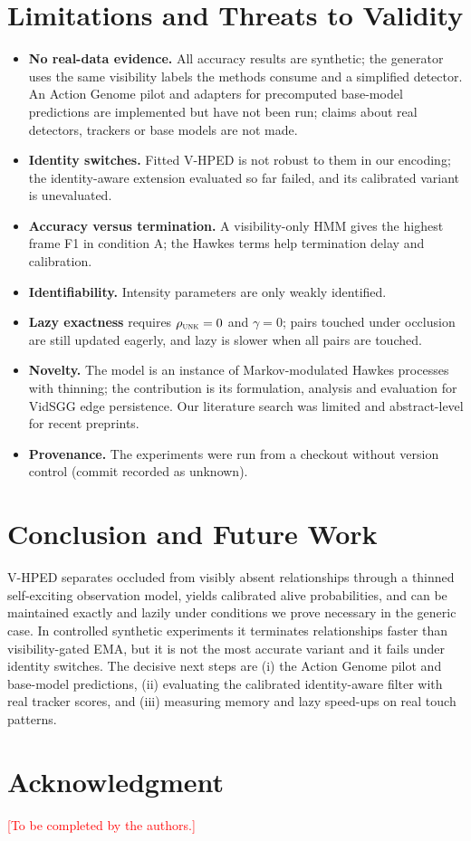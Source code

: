 \documentclass[conference]{IEEEtran}
\newcommand{\UNK}{\textsc{unk}}
\begin{document}
\section{Limitations and Threats to Validity}
\begin{itemize}
\item \textbf{No real-data evidence.} All accuracy results are synthetic; the generator
uses the same visibility labels the methods consume and a simplified detector. An Action
Genome pilot and adapters for precomputed base-model predictions are implemented but have
not been run; claims about real detectors, trackers or base models are not made.
\item \textbf{Identity switches.} Fitted V-HPED is not robust to them in our encoding; the
identity-aware extension evaluated so far failed, and its calibrated variant is unevaluated.
\item \textbf{Accuracy versus termination.} A visibility-only HMM gives the highest frame F1
in condition A; the Hawkes terms help termination delay and calibration.
\item \textbf{Identifiability.} Intensity parameters are only weakly identified.
\item \textbf{Lazy exactness} requires $\rho_{\UNK}=0$ and $\gamma=0$; pairs touched under
occlusion are still updated eagerly, and lazy is slower when all pairs are touched.
\item \textbf{Novelty.} The model is an instance of Markov-modulated Hawkes processes with
thinning; the contribution is its formulation, analysis and evaluation for VidSGG edge
persistence. Our literature search was limited and abstract-level for recent preprints.
\item \textbf{Provenance.} The experiments were run from a checkout without version control
(commit recorded as unknown).
\end{itemize}

\section{Conclusion and Future Work}
V-HPED separates occluded from visibly absent relationships through a thinned
self-exciting observation model, yields calibrated alive probabilities, and can be
maintained exactly and lazily under conditions we prove necessary in the generic case. In
controlled synthetic experiments it terminates relationships faster than visibility-gated
EMA, but it is not the most accurate variant and it fails under identity switches. The
decisive next steps are (i) the Action Genome pilot and base-model predictions, (ii)
evaluating the calibrated identity-aware filter with real tracker scores, and (iii)
measuring memory and lazy speed-ups on real touch patterns.

\section*{Acknowledgment}
\textcolor{red}{[To be completed by the authors.]}



\end{document}
